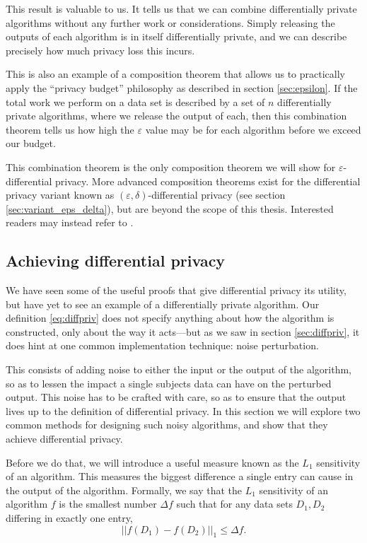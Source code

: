 \documentclass[12pt]{article}
\renewcommand{\epsilon}{\varepsilon}
\begin{document}
This result is valuable to us. It tells us that we can combine differentially private algorithms without any further work or considerations. Simply releasing the outputs of each algorithm is in itself differentially private, and we can describe precisely how much privacy loss this incurs.

This is also an example of a composition theorem that allows us to practically apply the ``privacy budget'' philosophy as described in section \ref{sec:epsilon}. If the total work we perform on a data set is described by a set of $n$ differentially private algorithms, where we release the output of each, then this combination theorem tells us how high the $\epsilon$ value may be for each algorithm before we exceed our budget. \bigskip

This combination theorem is the only composition theorem we will show for $\epsilon$-differential privacy. More advanced composition theorems exist for the differential privacy variant known as $(\epsilon,\delta)$-differential privacy (see section \ref{sec:variant_eps_delta}), but are beyond the scope of this thesis. Interested readers may instead refer to \cite[ch.~3]{dwork_privacybook}.

\subsection{Achieving differential privacy \label{sec:achieving}}

We have seen some of the useful proofs that give differential privacy its utility, but have yet to see an example of a differentially private algorithm. Our definition \ref{eq:diffpriv} does not specify anything about how the algorithm is constructed, only about the way it acts---but as we saw in section \ref{sec:diffpriv}, it does hint at one common implementation technique: noise perturbation.

This consists of adding noise to either the input or the output of the algorithm, so as to lessen the impact a single subjects data can have on the perturbed output. This noise has to be crafted with care, so as to ensure that the output lives up to the definition of differential privacy. In this section we will explore two common methods for designing such noisy algorithms, and show that they achieve differential privacy. \bigskip

Before we do that, we will introduce a useful measure known as the $L_1$ sensitivity of an algorithm. This measures the biggest difference a single entry can cause in the output of the algorithm. Formally, we say that the $L_1$ sensitivity of an algorithm $f$ is the smallest number $\Delta f$ such that for any data sets $D_1,D_2$ differing in exactly one entry,
\begin{equation}\label{eq:L1_sensitivity}
    ||f(D_1)-f(D_2)||_1 \leq \Delta f.
\end{equation}
\end{document}
